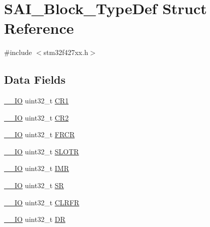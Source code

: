 \hypertarget{struct_s_a_i___block___type_def}{}\section{S\+A\+I\+\_\+\+Block\+\_\+\+Type\+Def Struct Reference}
\label{struct_s_a_i___block___type_def}


{\ttfamily \#include $<$stm32f427xx.\+h$>$}

\subsection*{Data Fields}
\begin{DoxyCompactItemize}
\item 
\hyperlink{core__sc300_8h_aec43007d9998a0a0e01faede4133d6be}{\+\_\+\+\_\+\+IO} uint32\+\_\+t \hyperlink{struct_s_a_i___block___type_def_ab0ec7102960640751d44e92ddac994f0}{C\+R1}
\item 
\hyperlink{core__sc300_8h_aec43007d9998a0a0e01faede4133d6be}{\+\_\+\+\_\+\+IO} uint32\+\_\+t \hyperlink{struct_s_a_i___block___type_def_afdfa307571967afb1d97943e982b6586}{C\+R2}
\item 
\hyperlink{core__sc300_8h_aec43007d9998a0a0e01faede4133d6be}{\+\_\+\+\_\+\+IO} uint32\+\_\+t \hyperlink{struct_s_a_i___block___type_def_ae307d5a553582e6c9717f50037245710}{F\+R\+CR}
\item 
\hyperlink{core__sc300_8h_aec43007d9998a0a0e01faede4133d6be}{\+\_\+\+\_\+\+IO} uint32\+\_\+t \hyperlink{struct_s_a_i___block___type_def_ad30f20f612dacf85a5bb7f9f97cf0772}{S\+L\+O\+TR}
\item 
\hyperlink{core__sc300_8h_aec43007d9998a0a0e01faede4133d6be}{\+\_\+\+\_\+\+IO} uint32\+\_\+t \hyperlink{struct_s_a_i___block___type_def_ae845b86e973b4bf8a33c447c261633f6}{I\+MR}
\item 
\hyperlink{core__sc300_8h_aec43007d9998a0a0e01faede4133d6be}{\+\_\+\+\_\+\+IO} uint32\+\_\+t \hyperlink{struct_s_a_i___block___type_def_af6aca2bbd40c0fb6df7c3aebe224a360}{SR}
\item 
\hyperlink{core__sc300_8h_aec43007d9998a0a0e01faede4133d6be}{\+\_\+\+\_\+\+IO} uint32\+\_\+t \hyperlink{struct_s_a_i___block___type_def_aa46ece753867049c7643819478b8330b}{C\+L\+R\+FR}
\item 
\hyperlink{core__sc300_8h_aec43007d9998a0a0e01faede4133d6be}{\+\_\+\+\_\+\+IO} uint32\+\_\+t \hyperlink{struct_s_a_i___block___type_def_a3df0d8dfcd1ec958659ffe21eb64fa94}{DR}
\end{DoxyCompactItemize}


